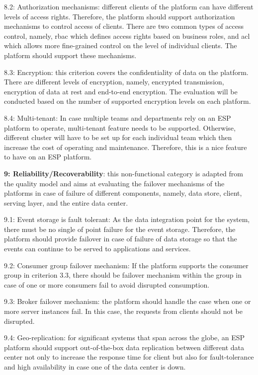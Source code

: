 8.2: Authorization mechanisms: different clients of the platform can have different levels of access rights. Therefore, the platform should support authorization mechanisms to control access of clients. There are two common types of access control, namely, \acrfull{rbac} which defines access rights based on business roles, and \acrfull{acl} which allows more fine-grained control on the level of individual clients. The platform should support these mechanisms.

8.3: Encryption: this criterion covers the confidentiality of data on the platform. There are different levels of encryption, namely, encrypted transmission, encryption of data at rest and end-to-end encryption. The evaluation will be conducted based on the number of supported encryption levels on each platform.

8.4: Multi-tenant: In case multiple teams and departments rely on an ESP platform to operate, multi-tenant feature needs to be supported. Otherwise, different cluster will have to be set up for each individual team which then increase the cost of operating and maintenance. Therefore, this is a nice feature to have on an ESP platform.

\textbf{9: Reliability/Recoverability}: this non-functional category is adapted from the quality model and aims at evaluating the failover mechanisms of the platforms in case of failure of different components, namely, data store, client, serving layer, and the entire data center.

9.1: Event storage is fault tolerant: As the data integration point for the system, there must be no single of point failure for the event storage. Therefore, the platform should provide failover in case of failure of data storage so that the events can continue to be served to applications and services.

9.2: Consumer group failover mechanism: If the platform supports the consumer group in criterion 3.3, there should be failover mechanism within the group in case of one or more consumers fail to avoid disrupted consumption.

9.3: Broker failover mechanism: the platform should handle the case when one or more server instances fail. In this case, the requests from clients should not be disrupted. 

9.4: Geo-replication: for significant systems that span across the globe, an ESP platform should support out-of-the-box data replication between different data center not only to increase the response time for client but also for fault-tolerance and high availability in case one of the data center is down.

